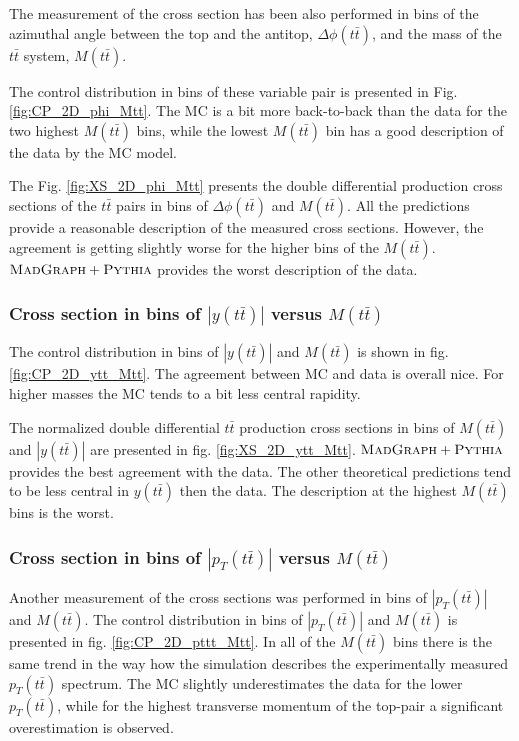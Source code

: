 The measurement of the cross section has been also performed in bins of the azimuthal angle between the top and the antitop, $\Delta\phi(t\bar{t})$, and the mass
of the $t\bar{t}$ system, $M(t\bar{t})$.

The control distribution in bins of these variable pair is presented in Fig. \ref{fig:CP_2D_phi_Mtt}. The MC is a bit more back-to-back than the data for the
two highest $M(t\bar{t})$ bins, while the lowest $M(t\bar{t})$ bin has a good description of the data by the MC model.

The Fig. \ref{fig:XS_2D_phi_Mtt} presents the double differential production cross sections of the $t\bar{t}$ pairs in bins of $\Delta\phi(t\bar{t})$ and $M(t\bar{t})$.
All the predictions provide a reasonable description of the measured cross sections. However, the agreement is getting slightly worse for the higher bins of the $M(t\bar{t})$.
$\textsc{MadGraph}+\textsc{Pythia}$ provides the worst description of the data.

\subsubsection{Cross section in bins of $|y(t\bar{t})|$ versus $M(t\bar{t})$}

The control distribution in bins of $|y(t\bar{t})|$ and $M(t\bar{t})$ is shown in fig. \ref{fig:CP_2D_ytt_Mtt}. The agreement between MC and data is overall nice.
For higher masses the MC tends to a bit less central rapidity.

The normalized double differential $t\bar{t}$ production cross sections in bins of $M(t\bar{t})$ and $|y(t\bar{t})|$ are presented in fig. \ref{fig:XS_2D_ytt_Mtt}.
$\textsc{MadGraph}+\textsc{Pythia}$ provides the best agreement with the data. 
The other theoretical predictions tend to be less central in $y(t\bar{t})$ then the data. 
The description at the highest $M(t\bar{t})$ bins is the worst.

\subsubsection{Cross section in bins of $|p_{T}(t\bar{t})|$ versus $M(t\bar{t})$}

Another measurement of the cross sections was performed in bins of $|p_{T}(t\bar{t})|$ and $M(t\bar{t})$.
The control distribution in bins of $|p_{T}(t\bar{t})|$ and $M(t\bar{t})$ is presented in fig. \ref{fig:CP_2D_pttt_Mtt}. In all of the $M(t\bar{t})$
bins there is the same trend in the way how the simulation describes the experimentally measured $p_{T}(t\bar{t})$ spectrum. The MC slightly underestimates
the data for the lower $p_{T}(t\bar{t})$, while for the highest transverse momentum of the top-pair a significant overestimation is observed.

